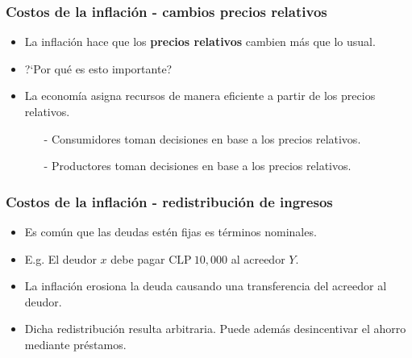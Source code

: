 \documentclass{beamer}
\begin{document}
\begin{frame}
\frametitle{Costos de la inflaci\'on - cambios precios relativos}
\begin{itemize}
\setlength\itemsep{1.4em}
\item La inflaci\'on hace que los \textbf{precios relativos} cambien m\'as que lo usual.
\item ?`Por qu\'e es esto importante?
\item La econom\'ia asigna recursos de manera eficiente a partir de los precios relativos.\\
\begin{itemize}
\setlength\itemsep{0.9em}
\item[-] Consumidores toman decisiones en base a los precios relativos.
\item[-] Productores toman decisiones en base a los precios relativos.
\end{itemize}
\end{itemize}
\end{frame}

\begin{frame}
\frametitle{Costos de la inflaci\'on - redistribuci\'on de ingresos}
\begin{itemize}
\setlength\itemsep{1.4em}
\item Es com\'un que las deudas est\'en fijas es t\'erminos nominales.
\item E.g. El deudor $x$ debe pagar $\text{CLP} \: 10,000$ al acreedor $Y$.
\item La inflaci\'on erosiona la deuda causando una transferencia del acreedor al deudor.
\item Dicha redistribuci\'on resulta arbitraria. Puede adem\'as desincentivar el ahorro mediante pr\'estamos.
\end{itemize}
\end{frame}
\end{document}
